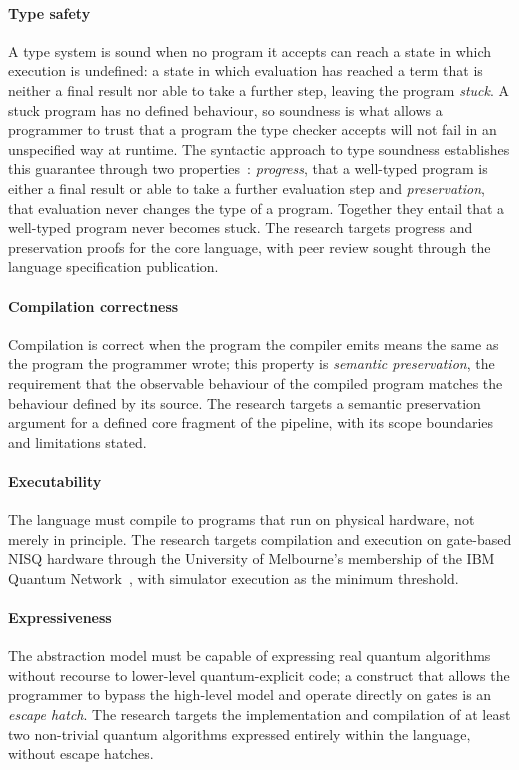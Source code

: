 \paragraph{Type safety} A type system is sound when no program it accepts can reach a state in which execution is undefined: a state in which evaluation has reached a term that is neither a final result nor able to take a further step, leaving the program \textit{stuck}.
A stuck program has no defined behaviour, so soundness is what allows a programmer to trust that a program the type checker accepts will not fail in an unspecified way at runtime.
The syntactic approach to type soundness establishes this guarantee through two properties~\cite{WrightFelleisen1994TypeSoundness}: \textit{progress}, that a well-typed program is either a final result or able to take a further evaluation step and \textit{preservation}, that evaluation never changes the type of a program.
Together they entail that a well-typed program never becomes stuck.
The research targets progress and preservation proofs for the core language, with peer review sought through the language specification publication.

\paragraph{Compilation correctness} Compilation is correct when the program the compiler emits means the same as the program the programmer wrote; this property is \textit{semantic preservation}, the requirement that the observable behaviour of the compiled program matches the behaviour defined by its source.
The research targets a semantic preservation argument for a defined core fragment of the pipeline, with its scope boundaries and limitations stated.

\paragraph{Executability} The language must compile to programs that run on physical hardware, not merely in principle.
The research targets compilation and execution on gate-based NISQ hardware through the University of Melbourne's membership of the IBM Quantum Network~\cite{UoMIBMQuantumHub}, with simulator execution as the minimum threshold.

\paragraph{Expressiveness} The abstraction model must be capable of expressing real quantum algorithms without recourse to lower-level quantum-explicit code; a construct that allows the programmer to bypass the high-level model and operate directly on gates is an \textit{escape hatch}.
The research targets the implementation and compilation of at least two non-trivial quantum algorithms expressed entirely within the language, without escape hatches.


